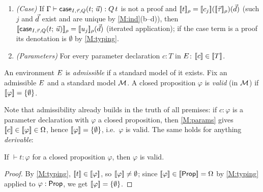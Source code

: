 \begin{definition}
\begin{enumerate}[label=(M\arabic*),leftmargin=3.2em]
\begin{enumerate}[label=(\alph*)]
    over $j$ of the images of $\sem{c_j}(\tup{a})$ on well-typed
    argument tuples.
  \end{enumerate}
\item \label{M:case} \emph{(Case)}
  If $\Gamma \vdash \mathsf{case}_{I,\vec{\tau},Q}(t;\,\vec{u}) : Q\,t$ is not
  a proof and $[\![ t ]\!]_{\rho} = [\![ c_j ]\!]([\![ \vec{\tau} ]\!]_\rho)(\vec{d})$
  (such $j$ and $\vec{d}$ exist and are unique by
  \ref{M:ind}(b--d)), then
  $[\![ \mathsf{case}_{I,\vec{\tau},Q}(t;\,\vec{u}) ]\!]_{\rho} =
   [\![ u_j ]\!]_{\rho}(\vec{d})$ (iterated application); if the case
  term is a proof its denotation is $\emptyset$ by \ref{M:typing}.
\item \label{M:params} \emph{(Parameters)}
  For every parameter declaration $c : T$ in $E$:
  $[\![ c ]\!] \in [\![ T ]\!]$.
\end{enumerate}
\end{definition}

\begin{definition}
\label{def:admissible}
An environment $E$ is \emph{admissible} if a standard model of it
exists.  Fix an admissible $E$ and a standard model $\mathcal{M}$.  A
closed proposition $\varphi$ is \emph{valid} (in $\mathcal{M}$) if
$[\![ \varphi ]\!] = \{\emptyset\}$.
\end{definition}

Note that admissibility already builds in the truth of all premises:
if $c : \varphi$ is a parameter declaration with $\varphi$ a closed
proposition, then \ref{M:params} gives $[\![ c ]\!] \in [\![ \varphi ]\!] \in
\Omega$, hence $[\![ \varphi ]\!] = \{\emptyset\}$, i.e.\ $\varphi$ is valid.  The
same holds for anything \emph{derivable}:

\begin{proposition}
\label{prop:prov-valid}
If $\vdash t : \varphi$ for a closed proposition $\varphi$, then
$\varphi$ is valid.
\end{proposition}

\begin{proof}
By \ref{M:typing}, $[\![ t ]\!] \in [\![ \varphi ]\!]$, so $[\![ \varphi ]\!]
\neq \emptyset$; since $[\![ \varphi ]\!] \in [\![ \mathsf{Prop} ]\!] = \Omega$ by
\ref{M:typing} applied to $\varphi : \mathsf{Prop}$, we get $[\![ \varphi ]\!] =
\{\emptyset\}$.
\end{proof}

